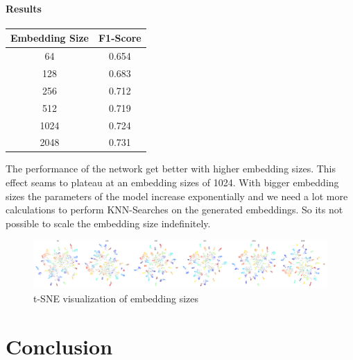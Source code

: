 \documentclass[12pt,a4paper]{report}
\begin{document}
\subsubsection*{Results}
\begin{table}
	\begin{tabular}{ | c | c | }
		\hline
		Embedding Size &  F1-Score \\ 
		\hline
		64 &  0.654 \\ 
		\hline
		128 & 0.683 \\ 
		\hline
		256 & 0.712 \\ 
		\hline
		512 & 0.719 \\ 
		\hline
		1024 & 0.724  \\ 
		\hline
		2048 & 0.731 \\ 
		\hline
	\end{tabular}
\end{table} 

The performance of the network get better with higher embedding sizes.
This effect seams to plateau at an embedding sizes of 1024.
With bigger embedding sizes the parameters of the model increase exponentially and we need a lot more calculations to perform KNN-Searches on the generated embeddings.
So its not possible to scale the embedding size indefinitely.
\\
\begin{figure}[h]
	\centering
	\includegraphics[width=\textwidth]{../plots/embedding_size.png}
	\caption{t-SNE visualization of embedding sizes}
\end{figure}


\chapter{Conclusion}

\newpage


\end{document}
